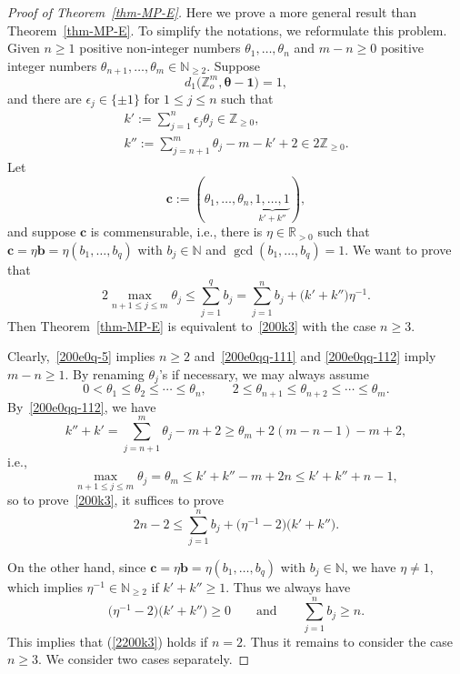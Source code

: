 \documentclass[pdftex]{sigma}
\numberwithin{equation}{section}
\def\N{\mathbb N}
\def\Z{\mathbb Z}
\begin{document}
\begin{proof}[Proof of Theorem~\ref{thm-MP-E}]
Here we prove a more general result than Theorem~\ref{thm-MP-E}. To
simplify the notations, we reformulate this problem. Given $n\geq 1$
positive non-integer numbers $\theta_1,\dots,\theta_n$ and $m-n\geq
0$ positive integer numbers $\theta_{n+1},\dots,\theta_{m}\in\N_{\geq
 2}$.
Suppose
\begin{equation}\label{200e0q-5}
d_1\bigl(\Z_o^{m},{\boldsymbol\theta-\boldsymbol 1}\bigr)=1,
\end{equation}
and there are $\epsilon_{j}\in\{\pm 1\}$ for $1\leq j\leq n$ such that
\begin{gather}\label{200e0qq-111}
k':=\sum_{j=1}^n \epsilon_{j}\theta_{j}\in\mathbb{Z}_{\geq 0},
\\ \label{200e0qq-112}
k'':=\sum_{j=n+1}^m \theta_{j}-m-k'+2\in 2\mathbb{Z}_{\geq 0}.
\end{gather}
Let
\[
 \boldsymbol c:=(\theta_1,\dots,\theta_{n},
 \underbrace{1,\dots,1}_{k'+k''}),
\]
and suppose $\boldsymbol c$ is commensurable, i.e., there is $\eta\in\mathbb{R}_{>0}$ such that $\mathbf{c}=\eta\mathbf{b}=\eta(b_1,\dots,b_q)$ with $b_j\in\mathbb{N}$ and $\gcd (b_1,\dots,b_q)=1$.
We want to prove that
\begin{equation}\label{200k3}2\max_{n+1\leq j\leq m}\theta_j\leq \sum_{j=1}^q b_j=\sum_{j=1}^nb_j+\bigl(k'+k''\bigr)\eta^{-1}.\end{equation}
Then Theorem~\ref{thm-MP-E} is equivalent to~\eqref{200k3} with the case $n\geq 3$.

Clearly,~\eqref{200e0q-5} implies $n\geq 2$ and~\eqref{200e0qq-111} and \eqref{200e0qq-112} imply $m-n\geq 1$. By renaming $\theta_j$'s if necessary, we may always assume
\[0<\theta_1\leq \theta_2\leq\cdots\leq \theta_n,\qquad 2\leq\theta_{n+1}\leq \theta_{n+2}\leq\cdots\leq \theta_m.\]
By~\eqref{200e0qq-112}, we have
\[k''+k'=\sum_{j=n+1}^m \theta_{j}-m+2\geq \theta_{m}+2(m-n-1)-m+2,\]
i.e.,
\[\max_{n+1\leq j\leq m}\theta_j=\theta_m\leq k'+k''-m+2n\leq k'+k''+n-1,\]
so to prove~\eqref{200k3}, it suffices to prove
\begin{equation}\label{2200k3}2n-2\leq \sum_{j=1}^n b_j+\bigl(\eta^{-1}-2\bigr)\bigl(k'+k''\bigr).\end{equation}

On the other hand, since
$\mathbf{c}=\eta\mathbf{b}=\eta(b_1,\dots,b_q)$ with
$b_j\in\mathbb{N}$, we have $\eta\neq 1$, which implies
$\eta^{-1}\in\mathbb{N}_{\geq 2}$ if $k'+k''\geq 1$. Thus we always
have
\[
 \bigl(\eta^{-1}-2\bigr)\bigl(k'+k''\bigr)\geq 0\qquad\text{and}\qquad \sum_{j=1}^n
 b_j\geq n.
\]
This implies that (\ref{2200k3}) holds if $n=2$. Thus it remains to consider the case $n\geq 3$. We consider two cases separately.


\end{proof}
\end{document}

